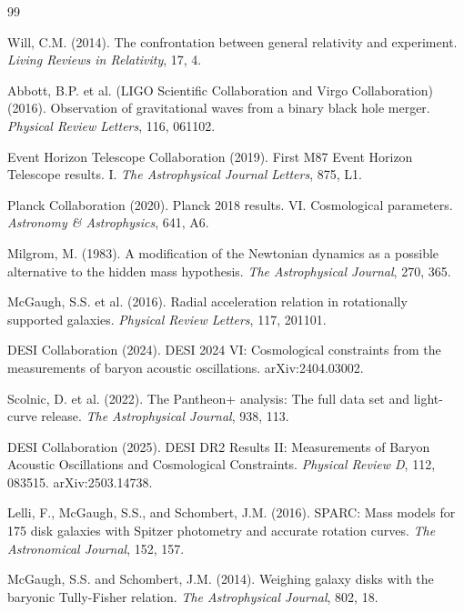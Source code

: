 \documentclass[12pt]{article}
\begin{document}
\begin{thebibliography}{99}

Will, C.M. (2014). The confrontation between general relativity and experiment.
\textit{Living Reviews in Relativity}, 17, 4.

Abbott, B.P. et al. (LIGO Scientific Collaboration and Virgo Collaboration) (2016).
Observation of gravitational waves from a binary black hole merger.
\textit{Physical Review Letters}, 116, 061102.

Event Horizon Telescope Collaboration (2019).
First M87 Event Horizon Telescope results. I.
\textit{The Astrophysical Journal Letters}, 875, L1.

Planck Collaboration (2020).
Planck 2018 results. VI. Cosmological parameters.
\textit{Astronomy \& Astrophysics}, 641, A6.

Milgrom, M. (1983).
A modification of the Newtonian dynamics as a possible alternative to the hidden mass hypothesis.
\textit{The Astrophysical Journal}, 270, 365.

McGaugh, S.S. et al. (2016).
Radial acceleration relation in rotationally supported galaxies.
\textit{Physical Review Letters}, 117, 201101.

DESI Collaboration (2024).
DESI 2024 VI: Cosmological constraints from the measurements of baryon acoustic oscillations.
arXiv:2404.03002.

Scolnic, D. et al. (2022).
The Pantheon+ analysis: The full data set and light-curve release.
\textit{The Astrophysical Journal}, 938, 113.

DESI Collaboration (2025).
DESI DR2 Results II: Measurements of Baryon Acoustic Oscillations and Cosmological Constraints.
\textit{Physical Review D}, 112, 083515.
arXiv:2503.14738.

Lelli, F., McGaugh, S.S., and Schombert, J.M. (2016).
SPARC: Mass models for 175 disk galaxies with Spitzer photometry and accurate rotation curves.
\textit{The Astronomical Journal}, 152, 157.

McGaugh, S.S. and Schombert, J.M. (2014).
Weighing galaxy disks with the baryonic Tully-Fisher relation.
\textit{The Astrophysical Journal}, 802, 18.

\end{thebibliography}
\end{document}
